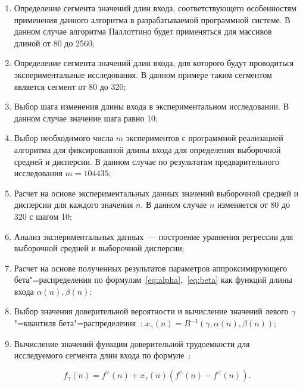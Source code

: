 \documentclass[a4paper, article, 14pt]{extarticle}
\begin{document}
\begin{enumerate}
	\item Определение сегмента значений длин входа, соответствующего особенностям применения данного алгоритма в разрабатываемой
	программной системе. В данном случае алгоритма Паллоттино будет применяться для массивов длиной от 80 до 2560;

	\item Определение сегмента значений длин входа, для которого будут проводиться экспериментальные исследования. В данном примере таким сегментом является сегмент от 80 до 320;

	\item Выбор шага изменения длины входа в экспериментальном исследовании. В данном случае значение шага равно 10;

	\item Выбор необходимого числа $m$ экспериментов с программной реализацией алгоритма для фиксированной длины входа для определения выборочной средней и дисперсии. В данном случае по результатам предварительного исследования $m = 104435$;

	\item Расчет на основе экспериментальных данных значений выборочной средней и дисперсии для каждого значения $n$. В данном случае $n$ изменяется от 80 до 320 с шагом 10;

	\item Анализ экспериментальных данных~--- построение уравнения регрессии для выборочной средней и выборочной дисперсии;

	\item Расчет на основе полученных результатов параметров аппроксимирующего бета"=распределения по формулам~\eqref{eq:alpha},~\eqref{eq:beta} как функций длины входа $\alpha(n), \beta(n)$;
	
	\item Выбор значения доверительной вероятности и вычисление значений левого $\gamma$"=квантиля бета"=распределения~\cite{petrushyn_ulyanov_definitions}: $x_\gamma(n) = B^{-1}(\gamma, \alpha(n), \beta(n))$;

	\item Вычисление значений функции доверительной трудоемкости для исследуемого сегмента длин входа по формуле~\cite{petrushyn_ulyanov_analysis}:

	\begin{equation}\label{eq:final_complexity_fucntion}
		f_\gamma(n) = f^\vee(n) + x_\gamma(n) (f^\wedge(n) - f^\vee(n)).
	\end{equation}
\end{enumerate}
\end{document}
